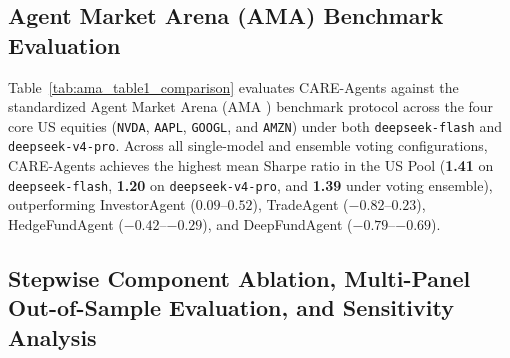 \documentclass[10pt,a4paper,twocolumn]{article}
\begin{document}
\subsection{Agent Market Arena (AMA) Benchmark Evaluation}

Table~\ref{tab:ama_table1_comparison} evaluates CARE-Agents against the standardized Agent Market Arena (AMA \cite{ama2025}) benchmark protocol across the four core US equities (\texttt{NVDA}, \texttt{AAPL}, \texttt{GOOGL}, and \texttt{AMZN}) under both \texttt{deepseek-flash} and \texttt{deepseek-v4-pro}. Across all single-model and ensemble voting configurations, CARE-Agents achieves the highest mean Sharpe ratio in the US Pool (\textbf{1.41} on \texttt{deepseek-flash}, \textbf{1.20} on \texttt{deepseek-v4-pro}, and \textbf{1.39} under voting ensemble), outperforming InvestorAgent ($0.09$--$0.52$), TradeAgent ($-0.82$--$0.23$), HedgeFundAgent ($-0.42$--$-0.29$), and DeepFundAgent ($-0.79$--$-0.69$).



\subsection{Stepwise Component Ablation, Multi-Panel Out-of-Sample Evaluation, and Sensitivity Analysis}
\end{document}
